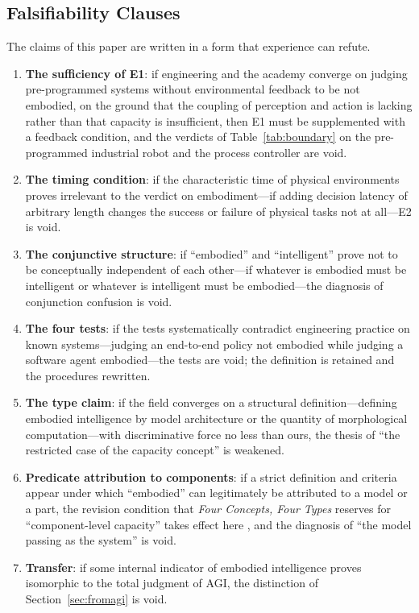 \documentclass[10pt]{article}
\begin{document}
\subsection{Falsifiability Clauses}\label{sec:falsify}

The claims of this paper are written in a form that experience can refute.

\begin{enumerate}
\item \textbf{The sufficiency of E1}: if engineering and the academy converge on judging pre-programmed systems without environmental feedback to be not embodied, on the ground that the coupling of perception and action is lacking rather than that capacity is insufficient, then E1 must be supplemented with a feedback condition, and the verdicts of Table~\ref{tab:boundary} on the pre-programmed industrial robot and the process controller are void.
\item \textbf{The timing condition}: if the characteristic time of physical environments proves irrelevant to the verdict on embodiment---if adding decision latency of arbitrary length changes the success or failure of physical tasks not at all---E2 is void.
\item \textbf{The conjunctive structure}: if ``embodied'' and ``intelligent'' prove not to be conceptually independent of each other---if whatever is embodied must be intelligent or whatever is intelligent must be embodied---the diagnosis of conjunction confusion is void.
\item \textbf{The four tests}: if the tests systematically contradict engineering practice on known systems---judging an end-to-end policy not embodied while judging a software agent embodied---the tests are void; the definition is retained and the procedures rewritten.
\item \textbf{The type claim}: if the field converges on a structural definition---defining embodied intelligence by model architecture or the quantity of morphological computation---with discriminative force no less than ours, the thesis of ``the restricted case of the capacity concept'' is weakened.
\item \textbf{Predicate attribution to components}: if a strict definition and criteria appear under which ``embodied'' can legitimately be attributed to a model or a part, the revision condition that \textit{Four Concepts, Four Types} reserves for ``component-level capacity'' takes effect here \cite{yu2026four}, and the diagnosis of ``the model passing as the system'' is void.
\item \textbf{Transfer}: if some internal indicator of embodied intelligence proves isomorphic to the total judgment of AGI, the distinction of Section~\ref{sec:fromagi} is void.
\end{enumerate}
\end{document}
